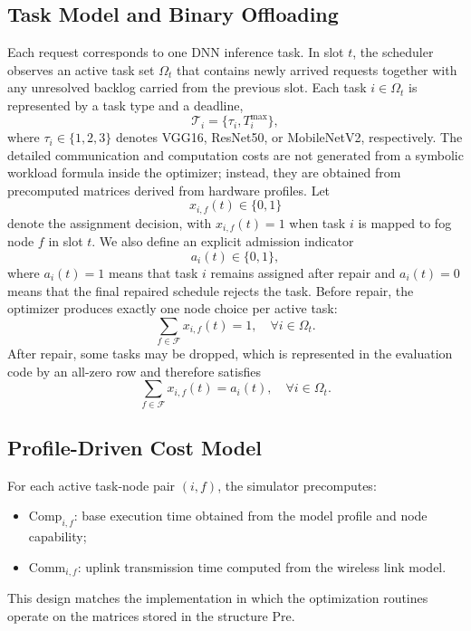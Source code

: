 \documentclass[pdflatex,sn-mathphys-num]{sn-jnl}
\begin{document}
\subsection{Task Model and Binary Offloading}
Each request corresponds to one DNN inference task. In slot $t$, the scheduler observes an active task set $\Omega_t$ that contains newly arrived requests together with any unresolved backlog carried from the previous slot. Each task $i \in \Omega_t$ is represented by a task type and a deadline,
\begin{equation}
    \mathcal{T}_i = \{\tau_i, T_i^{\max}\},
\end{equation}
where $\tau_i \in \{1,2,3\}$ denotes VGG16, ResNet50, or MobileNetV2, respectively. The detailed communication and computation costs are not generated from a symbolic workload formula inside the optimizer; instead, they are obtained from precomputed matrices derived from hardware profiles. Let
\begin{equation}
    x_{i,f}(t) \in \{0,1\}
\end{equation}
denote the assignment decision, with $x_{i,f}(t)=1$ when task $i$ is mapped to fog node $f$ in slot $t$. We also define an explicit admission indicator
\begin{equation}
    a_i(t) \in \{0,1\},
\end{equation}
where $a_i(t)=1$ means that task $i$ remains assigned after repair and $a_i(t)=0$ means that the final repaired schedule rejects the task. Before repair, the optimizer produces exactly one node choice per active task:
\begin{equation}
    \sum_{f \in \mathcal{F}} x_{i,f}(t)=1,\quad \forall i \in \Omega_t.
\end{equation}
After repair, some tasks may be dropped, which is represented in the evaluation code by an all-zero row and therefore satisfies
\begin{equation}
    \sum_{f \in \mathcal{F}} x_{i,f}(t)=a_i(t),\quad \forall i \in \Omega_t.
\end{equation}

\subsection{Profile-Driven Cost Model}
For each active task-node pair $(i,f)$, the simulator precomputes:
\begin{itemize}
    \item $\mathrm{Comp}_{i,f}$: base execution time obtained from the model profile and node capability;
    \item $\mathrm{Comm}_{i,f}$: uplink transmission time computed from the wireless link model.
\end{itemize}
This design matches the implementation in which the optimization routines operate on the matrices stored in the structure $\mathrm{Pre}$.
\end{document}

